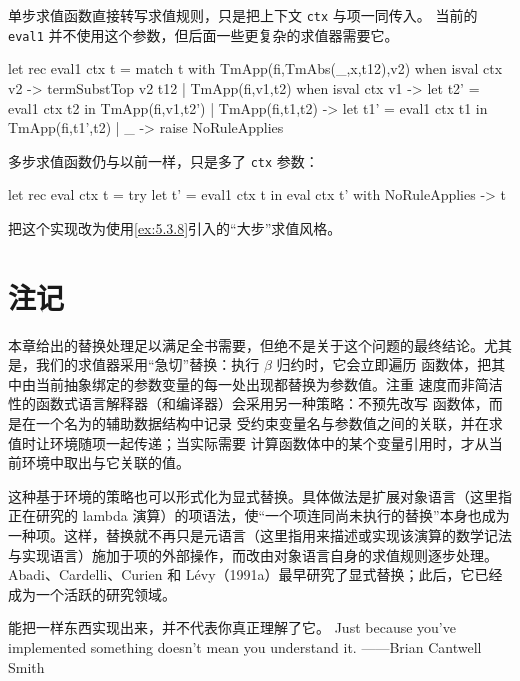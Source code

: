 单步求值函数直接转写求值规则，只是把上下文 \texttt{ctx} 与项一同传入。
当前的 \texttt{eval1} 并不使用这个参数，但后面一些更复杂的求值器需要它。

\begin{taplocamlcode}
let rec eval1 ctx t = match t with
    TmApp(fi,TmAbs(_,x,t12),v2) when isval ctx v2 ->
      termSubstTop v2 t12
  | TmApp(fi,v1,t2) when isval ctx v1 ->
      let t2' = eval1 ctx t2 in
      TmApp(fi,v1,t2')
  | TmApp(fi,t1,t2) ->
      let t1' = eval1 ctx t1 in
      TmApp(fi,t1',t2)
  | _ ->
      raise NoRuleApplies
\end{taplocamlcode}

多步求值函数仍与以前一样，只是多了 \texttt{ctx} 参数：

\begin{taplocamlcode}
let rec eval ctx t =
  try
    let t' = eval1 ctx t in
    eval ctx t'
  with NoRuleApplies -> t
\end{taplocamlcode}

\begin{exercise}
\label{ex:7.3.1}
把这个实现改为使用\cref{ex:5.3.8}引入的“大步”求值风格。
\end{exercise}

\section{注记}
\label{sec:7.4}

本章给出的替换处理足以满足全书需要，但绝不是关于这个问题的最终结论。尤其
是，我们的求值器采用“急切”替换：执行 \(\beta\) 归约时，它会立即遍历
函数体，把其中由当前抽象绑定的参数变量的每一处出现都替换为参数值。注重
速度而非简洁性的函数式语言解释器（和编译器）会采用另一种策略：不预先改写
函数体，而是在一个名为的辅助数据结构中记录
受约束变量名与参数值之间的关联，并在求值时让环境随项一起传递；当实际需要
计算函数体中的某个变量引用时，才从当前环境中取出与它关联的值。

这种基于环境的策略也可以形式化为显式替换。具体做法是扩展对象语言（这里指
正在研究的 lambda 演算）的项语法，使“一个项连同尚未执行的替换”本身也成为
一种项。这样，替换就不再只是元语言（这里指用来描述或实现该演算的数学记法
与实现语言）施加于项的外部操作，而改由对象语言自身的求值规则逐步处理。
Abadi、Cardelli、Curien 和 Lévy（1991a）最早研究了显式替换；此后，它已经
成为一个活跃的研究领域。

\bilingualepigraph
  {能把一样东西实现出来，并不代表你真正理解了它。}
  {Just because you've implemented something doesn't mean you understand it.}
  {——Brian Cantwell Smith}

